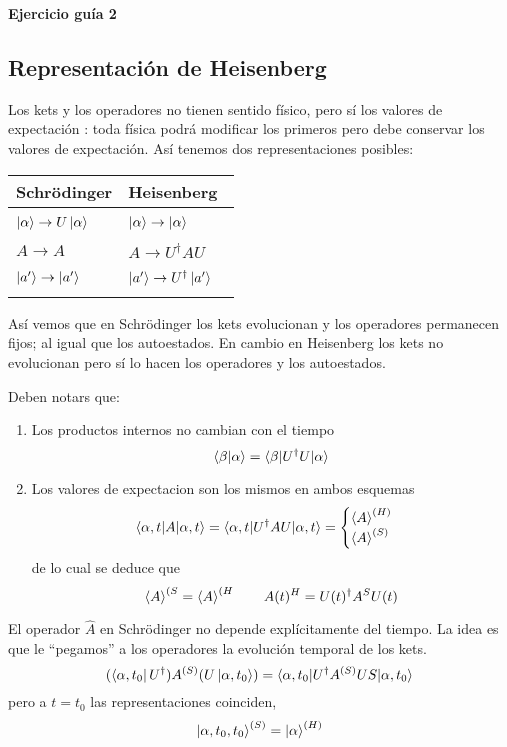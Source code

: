 \documentclass[10pt,oneside]{CBFT_book}
\begin{document}
\begin{ejemplo}{\bf Ejercicio guía 2}
\end{ejemplo}





\subsection{Representación de Heisenberg}

Los kets y los operadores no tienen sentido físico, pero sí los valores de expectación : toda física podrá modificar 
los primeros pero debe conservar los valores de expectación. Así tenemos dos representaciones posibles:

\begin{center}
\begin{tabular}{|l|l|}
\hline
Schrödinger & Heisenberg \\
\hline
& \\
$\Ket{\alpha} \to U\Ket{\alpha} \quad $ & $\Ket{\alpha} \to \Ket{\alpha} \quad $ \\
& \\
$A \to A \quad $ & $A \to U^\dagger AU \quad$ \\
& \\
$\Ket{a'} \to \Ket{a'} \quad $ & $\Ket{a'} \to U^\dagger \Ket{a'} \quad $ \\
& \\
\hline
\end{tabular}
\end{center}
Así vemos que en Schrödinger los kets evolucionan y los operadores permanecen fijos; al igual que los autoestados.
En cambio en Heisenberg los kets no evolucionan pero sí lo hacen los operadores y los autoestados.

Deben notars que:
\begin{enumerate}
 \item Los productos internos no cambian con el tiempo
 \[
	\braket{\beta|\alpha} = \braket{\beta|U^\dagger U|\alpha} 
 \]
 \item Los valores de expectacion son los mismos en ambos esquemas
 \[
	\braket{\alpha,t|A|\alpha,t} = \braket{\alpha,t|U^\dagger AU|\alpha,t} =
	\begin{cases}
	 \braket{A}^{(H)} \\
	 \braket{A}^{(S)}
	\end{cases}
 \]
 de lo cual se deduce que 
 \[
	\Braket{A}^{(S} = \Braket{A}^{(H} \qquad A(t)^H = U(t)^\dagger A^S U(t)
 \]
\end{enumerate}

El operador $\hat{A}$ en Schrödinger no depende explícitamente del tiempo. La idea es que le ``pegamos'' a los 
operadores la evolución temporal de los kets.
\[
	(\Bra{ \alpha, t_0 } U^\dagger) A^{(S)} (U \Ket{\alpha, t_0 }) = 
	\braket{ \alpha, t_0 | U^\dagger A^{(S)} US | \alpha, t_0 }
\]
pero a $t=t_0$ las representaciones coinciden,
\[
	\Ket{\alpha,t_0,t_0}^{(S)} = \Ket{\alpha}^{(H)}
\]
\end{document}
